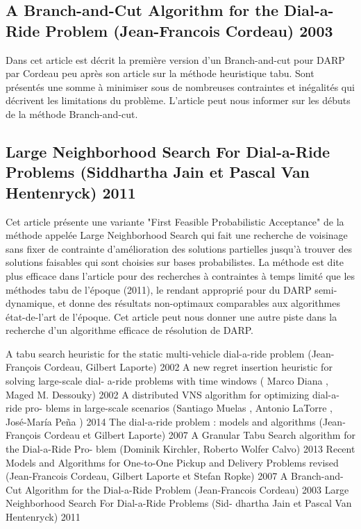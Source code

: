 \documentclass[10pt,a4paper]{report}
\begin{document}
\subsection*{A Branch-and-Cut Algorithm for the Dial-a-Ride Problem (Jean-Francois Cordeau) 2003}
Dans cet article est décrit la première version d'un Branch-and-cut pour DARP par Cordeau peu après son article sur la méthode heuristique tabu. Sont présentés une somme à minimiser sous de nombreuses contraintes et inégalités qui décrivent les limitations du problème. L'article peut nous informer sur les débuts de la méthode Branch-and-cut.
\subsection*{Large Neighborhood Search For Dial-a-Ride Problems (Siddhartha Jain et Pascal Van Hentenryck) 2011}
Cet article présente une variante "First Feasible Probabilistic Acceptance" de la méthode appelée Large Neighborhood Search qui fait une recherche de voisinage sans fixer de contrainte d'amélioration des solutions partielles jusqu'à trouver des solutions faisables qui sont choisies sur bases probabilistes. La méthode est dite plus efficace dans l'article pour des recherches à contraintes à temps limité que les méthodes tabu de l'époque (2011), le rendant approprié pour du DARP semi-dynamique, et donne des résultats non-optimaux comparables aux algorithmes état-de-l'art de l'époque. 
Cet article peut nous donner une autre piste dans la recherche d'un algorithme efficace de résolution de DARP.
\begin{thebibliography}{10}
\bibitem{} 
A tabu search heuristic for the static multi-vehicle
dial-a-ride problem (Jean-François Cordeau, Gilbert Laporte) 2002
\bibitem{}
A new regret insertion heuristic for solving large-scale dial-
a-ride problems with time windows ( Marco Diana , Maged
M. Dessouky) 2002
\bibitem{}
A distributed VNS algorithm for optimizing dial-a-ride pro-
blems in large-scale scenarios (Santiago Muelas , Antonio
LaTorre , José-María Peña ) 2014
\bibitem{}
The dial-a-ride problem : models and algorithms (Jean-
François Cordeau et Gilbert Laporte) 2007
\bibitem{}
A Granular Tabu Search algorithm for the Dial-a-Ride Pro-
blem (Dominik Kirchler, Roberto Wolfer Calvo) 2013
\bibitem{}
Recent Models and Algorithms for One-to-One Pickup and
Delivery Problems revised (Jean-Francois Cordeau, Gilbert
Laporte et Stefan Ropke) 2007
\bibitem{}
A Branch-and-Cut Algorithm for the Dial-a-Ride Problem
(Jean-Francois Cordeau) 2003
\bibitem{}
Large Neighborhood Search For Dial-a-Ride Problems (Sid-
dhartha Jain et Pascal Van Hentenryck) 2011

\end{thebibliography}
\end{document}
